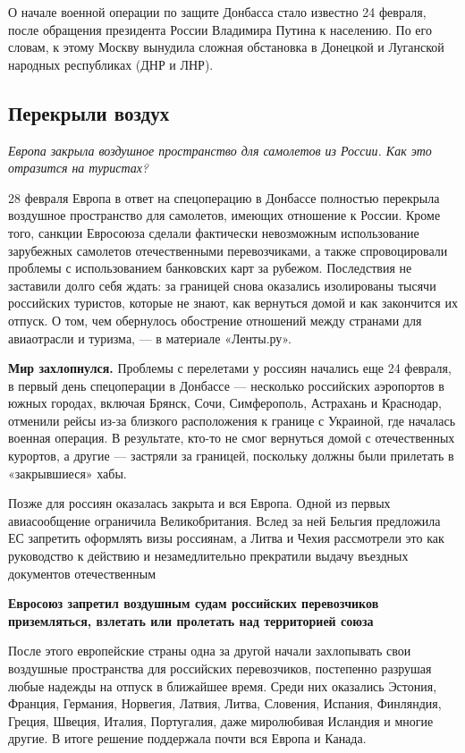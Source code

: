 О начале военной операции по защите Донбасса стало известно 24 февраля, после обращения президента России Владимира Путина к населению. По его словам, к этому Москву вынудила сложная обстановка в Донецкой и Луганской народных республиках (ДНР и ЛНР).

\subsection{Перекрыли воздух}
\textit{Европа закрыла воздушное пространство для самолетов из России. Как это отразится на туристах?}

28 февраля Европа в ответ на спецоперацию в Донбассе полностью перекрыла воздушное пространство для самолетов, имеющих отношение к России. Кроме того, санкции Евросоюза сделали фактически невозможным использование зарубежных самолетов отечественными перевозчиками, а также спровоцировали проблемы с использованием банковских карт за рубежом. Последствия не заставили долго себя ждать: за границей снова оказались изолированы тысячи российских туристов, которые не знают, как вернуться домой и как закончится их отпуск. О том, чем обернулось обострение отношений между странами для авиаотрасли и туризма, --- в материале «Ленты.ру».

\textbf{Мир захлопнулся.}
Проблемы с перелетами у россиян начались еще 24 февраля, в первый день спецоперации в Донбассе --- несколько российских аэропортов в южных городах, включая Брянск, Сочи, Симферополь, Астрахань и Краснодар, отменили рейсы из-за близкого расположения к границе с Украиной, где началась военная операция. В результате, кто-то не смог вернуться домой с отечественных курортов, а другие --- застряли за границей, поскольку должны были прилетать в «закрывшиеся» хабы.

Позже для россиян оказалась закрыта и вся Европа. Одной из первых авиасообщение ограничила Великобритания. Вслед за ней Бельгия предложила ЕС запретить оформлять визы россиянам, а Литва и Чехия рассмотрели это как руководство к действию и незамедлительно прекратили выдачу въездных документов отечественным

\begin{center}
    \bf \Large Евросоюз запретил воздушным судам российских перевозчиков приземляться, взлетать или пролетать над территорией союза
\end{center}

После этого европейские страны одна за другой начали захлопывать свои воздушные пространства для российских перевозчиков, постепенно разрушая любые надежды на отпуск в ближайшее время. Среди них оказались Эстония, Франция, Германия, Норвегия, Латвия, Литва, Словения, Испания, Финляндия, Греция, Швеция, Италия, Португалия, даже миролюбивая Исландия и многие другие. В итоге решение поддержала почти вся Европа и Канада.


